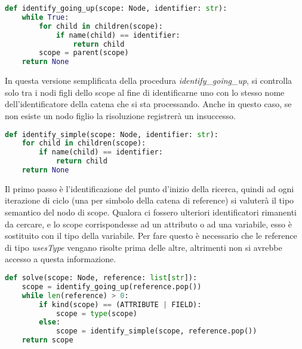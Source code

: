 \begin{lstlisting}[caption="Pseudocodice della procedura di ricerca senza limite superiore", language=Python]
def identify_going_up(scope: Node, identifier: str):
    while True:
        for child in children(scope):
            if name(child) == identifier:
                return child
        scope = parent(scope)
    return None
\end{lstlisting}

In questa versione semplificata della procedura \emph{identify\_going\_up}, si controlla solo tra i nodi figli dello scope al fine di identificarne uno con lo stesso nome dell'identificatore della catena che si sta processando. Anche in questo caso, se non esiste un nodo figlio la risoluzione registrer\`a un insuccesso.

\begin{lstlisting}[caption="Pseudocodice della procedura di ricerca con scope", language=Python]
def identify_simple(scope: Node, identifier: str):
    for child in children(scope):
        if name(child) == identifier:
            return child
    return None
\end{lstlisting}

Il primo passo \`e l'identificazione del punto d'inizio della ricerca, quindi ad ogni iterazione di ciclo (una per simbolo della catena di reference) si valuter\`a il tipo semantico del nodo di scope. Qualora ci fossero ulteriori identificatori rimanenti da cercare, e lo scope corrispondesse ad un attributo o ad una variabile, esso \`e sostituito con il tipo della variabile. Per fare questo \`e necessario che le reference di tipo \emph{usesType} vengano risolte prima delle altre, altrimenti non si avrebbe accesso a questa informazione.

\begin{lstlisting}[caption="Pseudocodice della procedura di risoluzione delle reference", language=Python]
def solve(scope: Node, reference: list[str]):
    scope = identify_going_up(reference.pop())
    while len(reference) > 0:
        if kind(scope) == (ATTRIBUTE | FIELD):
            scope = type(scope)
        else:
            scope = identify_simple(scope, reference.pop())
    return scope
\end{lstlisting}


